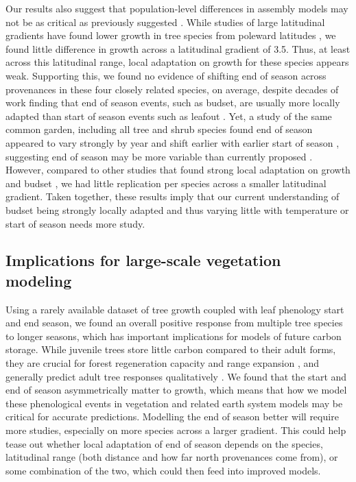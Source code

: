 Our results also suggest that population-level differences in assembly models may not be as critical as previously suggested \citep{cavender-bares_diversification_2019}. While studies of large latitudinal gradients have found lower growth in tree species from poleward latitudes \citep{soolanayakanahally_timing_2013,aitken_time_2016}, we found little difference in growth across a latitudinal gradient of 3.5\degree. Thus, at least across this latitudinal range, local adaptation on growth for these species appears weak. Supporting this, we found no evidence of shifting end of season across provenances in these four closely related species, on average, despite decades of work finding that end of season events, such as budset, are usually more locally adapted than start of season events such as leafout \citep{kramer_effect_1936,habjorg_photoperiodic_1978,keller_climatedriven_2011,soolanayakanahally_timing_2013,aitken_time_2016,zeng_weak_2024}. Yet, a study of the same common garden, including all tree and shrub species found end of season appeared to vary strongly by year and shift earlier with earlier start of season \citep{buonaiuto_early_2026}, suggesting end of season may be more variable than currently proposed \citep{alberto_potential_2013}. However, compared to other studies that found strong local adaptation on growth and budset \citep[e.g.][]{rohde_bud_2011}, we had little replication per species across a smaller latitudinal gradient. Taken together, these results imply that our current understanding of budset being strongly locally adapted and thus varying little with temperature or start of season needs more study. 

\subsection{Implications for large-scale vegetation modeling}
Using a rarely available dataset of tree growth coupled with leaf phenology start and end season, we found an overall positive response from multiple tree species to longer seasons, which has important implications for models of future carbon storage. While juvenile trees store little carbon compared to their adult forms, they are crucial for forest regeneration capacity and range expansion \citep[as discussed above, and see][]{luu_importance_2024}, and generally predict adult tree responses qualitatively \citep{wolkovich_why_2025}. We found that the start and end of season asymmetrically matter to growth, which means that how we model these phenological events in vegetation and related earth system models may be critical for accurate predictions. Modelling the end of season better will require more studies, especially on more species across a larger gradient. This could help tease out whether local adaptation of end of season depends on the species, latitudinal range (both distance and how far north provenances come from), or some combination of the two, which could then feed into improved models. 

